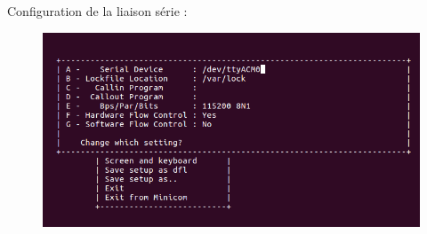 \documentclass{article}
\begin{document}
Configuration de la liaison série :

\begin{figure}[H]
\begin{center}
\advance\leftskip-3cm
\advance\rightskip-3cm
\includegraphics[keepaspectratio=true,scale=0.5]{loramacgateway_minicomconfig.png}
\label{visina8}
\end{center}\end{figure}
\end{document}
